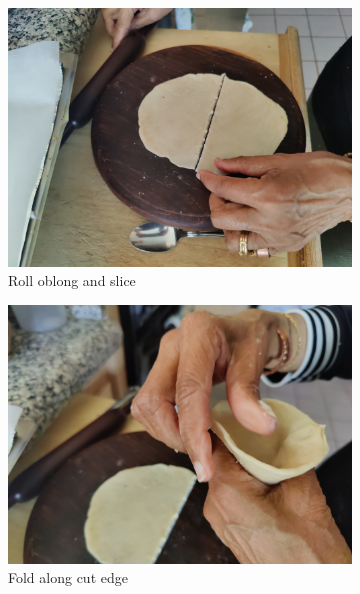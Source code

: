\begin{figure}[H]
  \centering
  \begin{subfigure}[b]{0.3\textwidth}
    \includegraphics[width=\textwidth]{Samosa/Images/IMG_20231230_143632.jpg}
    \caption{Roll oblong and slice}
  \end{subfigure}
  \hfill
  \begin{subfigure}[b]{0.3\textwidth}
    \includegraphics[width=\textwidth]{Samosa/Images/IMG_20231230_143649.jpg}
    \caption{Fold along cut edge}
  \end{subfigure}
  \begin{subfigure}[b]{0.3\textwidth}

\end{subfigure}
\end{figure}
